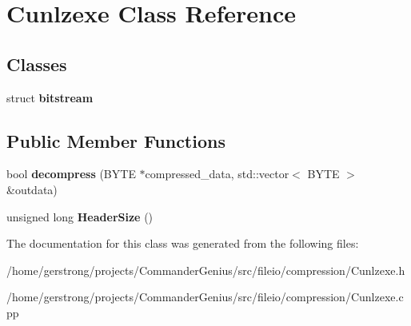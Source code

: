 \hypertarget{class_cunlzexe}{
\section{Cunlzexe Class Reference}
\label{class_cunlzexe}
}
\subsection*{Classes}
\begin{DoxyCompactItemize}
\item 
struct {\bfseries bitstream}
\end{DoxyCompactItemize}
\subsection*{Public Member Functions}
\begin{DoxyCompactItemize}
\item 
\hypertarget{class_cunlzexe_a2569e3e845fe299a6dc053757cbdd34c}{
bool {\bfseries decompress} (BYTE $\ast$compressed\_\-data, std::vector$<$ BYTE $>$ \&outdata)}
\label{class_cunlzexe_a2569e3e845fe299a6dc053757cbdd34c}

\item 
\hypertarget{class_cunlzexe_a59afe9b699cb9033b51e621da9cbcec9}{
unsigned long {\bfseries HeaderSize} ()}
\label{class_cunlzexe_a59afe9b699cb9033b51e621da9cbcec9}

\end{DoxyCompactItemize}


The documentation for this class was generated from the following files:\begin{DoxyCompactItemize}
\item 
/home/gerstrong/projects/CommanderGenius/src/fileio/compression/Cunlzexe.h\item 
/home/gerstrong/projects/CommanderGenius/src/fileio/compression/Cunlzexe.cpp\end{DoxyCompactItemize}
